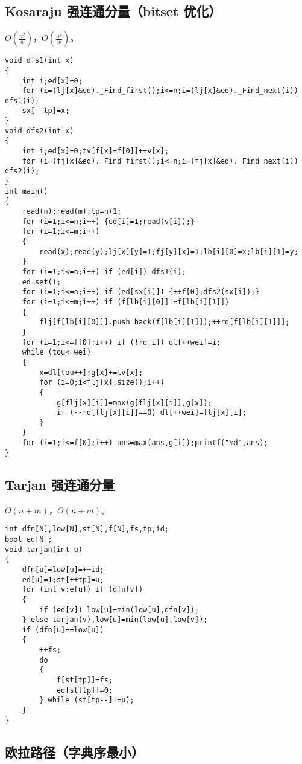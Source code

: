 \documentclass{ctexart}
\begin{document}
\subsection{Kosaraju 强连通分量（bitset 优化）}

$O(\frac{n^2}w)$，$O(\frac {n^2}w)$。

\begin{lstlisting}
void dfs1(int x)
{
	int i;ed[x]=0;
	for (i=(lj[x]&ed)._Find_first();i<=n;i=(lj[x]&ed)._Find_next(i)) dfs1(i);
	sx[--tp]=x;
}
void dfs2(int x)
{
	int i;ed[x]=0;tv[f[x]=f[0]]+=v[x];
	for (i=(fj[x]&ed)._Find_first();i<=n;i=(fj[x]&ed)._Find_next(i)) dfs2(i);
}
int main()
{
	read(n);read(m);tp=n+1;
	for (i=1;i<=n;i++) {ed[i]=1;read(v[i]);}
	for (i=1;i<=m;i++)
	{
		read(x);read(y);lj[x][y]=1;fj[y][x]=1;lb[i][0]=x;lb[i][1]=y;
	}
	for (i=1;i<=n;i++) if (ed[i]) dfs1(i);
	ed.set();
	for (i=1;i<=n;i++) if (ed[sx[i]]) {++f[0];dfs2(sx[i]);}
	for (i=1;i<=m;i++) if (f[lb[i][0]]!=f[lb[i][1]])
	{
		flj[f[lb[i][0]]].push_back(f[lb[i][1]]);++rd[f[lb[i][1]]];
	}
	for (i=1;i<=f[0];i++) if (!rd[i]) dl[++wei]=i;
	while (tou<=wei)
	{
		x=dl[tou++];g[x]+=tv[x];
		for (i=0;i<flj[x].size();i++)
		{
			g[flj[x][i]]=max(g[flj[x][i]],g[x]);
			if (--rd[flj[x][i]]==0) dl[++wei]=flj[x][i];
		}
	}
	for (i=1;i<=f[0];i++) ans=max(ans,g[i]);printf("%d",ans); 
}

\end{lstlisting}

\subsection{Tarjan 强连通分量}

$O(n+m)$，$O(n+m)$。

\begin{lstlisting}
int dfn[N],low[N],st[N],f[N],fs,tp,id;
bool ed[N];
void tarjan(int u)
{
	dfn[u]=low[u]=++id;
	ed[u]=1;st[++tp]=u;
	for (int v:e[u]) if (dfn[v])
	{
		if (ed[v]) low[u]=min(low[u],dfn[v]);
	} else tarjan(v),low[u]=min(low[u],low[v]);
	if (dfn[u]==low[u])
	{
		++fs;
		do
		{
			f[st[tp]]=fs;
			ed[st[tp]]=0;
		} while (st[tp--]!=u);
	}
}

\end{lstlisting}

\subsection{欧拉路径（字典序最小）}
\end{document}
